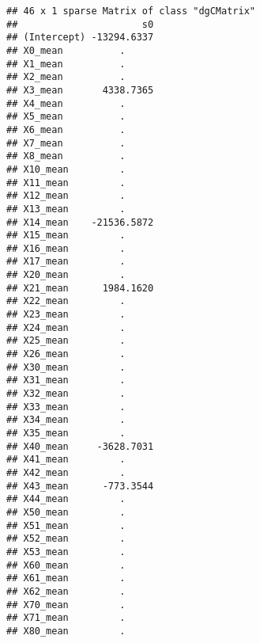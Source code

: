 \documentclass[
]{article}
\begin{document}
\begin{verbatim}
## 46 x 1 sparse Matrix of class "dgCMatrix"
##                      s0
## (Intercept) -13294.6337
## X0_mean          .     
## X1_mean          .     
## X2_mean          .     
## X3_mean       4338.7365
## X4_mean          .     
## X5_mean          .     
## X6_mean          .     
## X7_mean          .     
## X8_mean          .     
## X10_mean         .     
## X11_mean         .     
## X12_mean         .     
## X13_mean         .     
## X14_mean    -21536.5872
## X15_mean         .     
## X16_mean         .     
## X17_mean         .     
## X20_mean         .     
## X21_mean      1984.1620
## X22_mean         .     
## X23_mean         .     
## X24_mean         .     
## X25_mean         .     
## X26_mean         .     
## X30_mean         .     
## X31_mean         .     
## X32_mean         .     
## X33_mean         .     
## X34_mean         .     
## X35_mean         .     
## X40_mean     -3628.7031
## X41_mean         .     
## X42_mean         .     
## X43_mean      -773.3544
## X44_mean         .     
## X50_mean         .     
## X51_mean         .     
## X52_mean         .     
## X53_mean         .     
## X60_mean         .     
## X61_mean         .     
## X62_mean         .     
## X70_mean         .     
## X71_mean         .     
## X80_mean         .
\end{verbatim}
\end{document}
